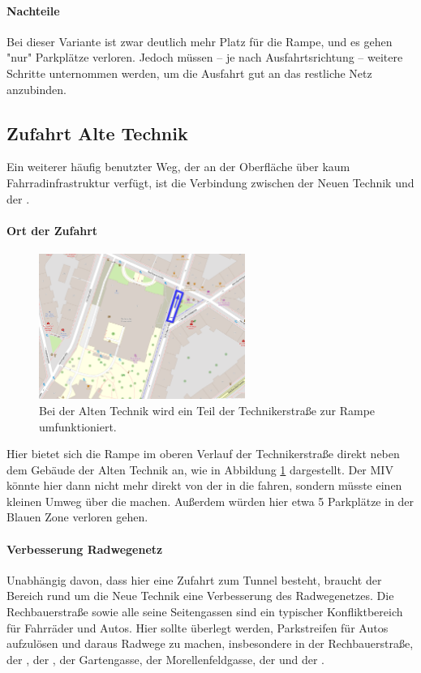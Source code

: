 \paragraph{Nachteile}
Bei dieser Variante ist zwar deutlich mehr Platz für die Rampe, und es gehen "nur" Parkplätze verloren. Jedoch müssen -- je nach Ausfahrtsrichtung -- weitere Schritte unternommen werden, um die Ausfahrt gut an das restliche Netz anzubinden.

\subsection{Zufahrt Alte Technik}
Ein weiterer häufig benutzter Weg, der an der Oberfläche über kaum Fahrradinfrastruktur verfügt, ist die Verbindung zwischen der Neuen Technik und der .

\paragraph{Ort der Zufahrt}
\begin{figure}
    \centering
    \includegraphics[width=0.6\textwidth]{main/bike/tunnel/uni/zufahrt_alte_technik}
    \caption[Zufahrten Alte Technik]{Bei der Alten Technik wird ein Teil der Technikerstraße zur Rampe umfunktioniert.}
    \label{fig:zufahrt_alte_technik}
\end{figure}

Hier bietet sich die Rampe im oberen Verlauf der Technikerstraße direkt neben dem Gebäude der Alten Technik an, wie in Abbildung \ref{fig:zufahrt_alte_technik} dargestellt. Der MIV könnte hier dann nicht mehr direkt von der  in die  fahren, sondern müsste einen kleinen Umweg über die  machen. Außerdem würden hier etwa 5 Parkplätze in der Blauen Zone verloren gehen.

\paragraph{Verbesserung Radwegenetz}
Unabhängig davon, dass hier eine Zufahrt zum Tunnel besteht, braucht der Bereich rund um die Neue Technik eine Verbesserung des Radwegenetzes. Die Rechbauerstraße sowie alle seine Seitengassen sind ein typischer Konfliktbereich für Fahrräder und Autos. Hier sollte überlegt werden, Parkstreifen für Autos aufzulösen und daraus Radwege zu machen, insbesondere in der Rechbauerstraße, der , der , der Gartengasse, der Morellenfeldgasse, der  und der .

